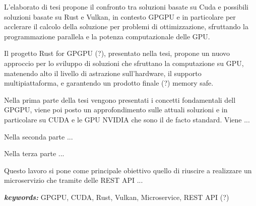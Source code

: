 
L'elaborato di tesi propone il confronto tra soluzioni basate su Cuda e possibili soluzioni basate su Rust e Vulkan, in contesto GPGPU e in particolare per acclerare il calcolo della soluzione per problemi di ottimizzazione, sfruttando la programmazione parallela e la potenza computazionale delle GPU.

Il progetto Rust for GPGPU (?), presentato nella tesi, propone un nuovo approccio per lo sviluppo di soluzioni che sfruttano la computazione su GPU, matenendo alto il livello di astrazione sull'hardware, il supporto multipiattaforma, e garantendo un prodotto finale (?) memory safe.

Nella prima parte della tesi vengono presentati i concetti fondamentali dell GPGPU, viene poi posto un approfondimento sulle attuali soluzioni e in particolare su CUDA e le GPU NVIDIA che sono il de facto standard. Viene ...

Nella seconda parte ...

Nella terza parte ...


Questo lavoro si pone come principale obiettivo quello di riuscire a realizzare un microservizio che tramite delle REST API ... 

\bigskip

\textit{\textbf{keywords:}} GPGPU, CUDA, Rust, Vulkan, Microservice, REST API (?)
